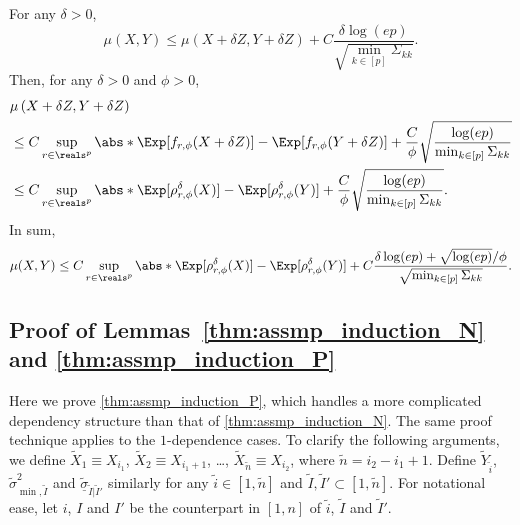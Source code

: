 \documentclass[aos]{imsart}
\begin{document}
\begin{appendix}
For any $\delta > 0$,
\begin{equation} \label{eq:G_smoothing}
    \mu\left(X, Y\right)
    \leq \mu\left(X + \delta Z, Y + \delta Z \right)
    + C \frac{\delta \log(ep)}{\sqrt{\min_{k \in [p]} \Sigma_{kk}}}.
\end{equation}
Then, for any $\delta > 0$ and $\phi > 0$, 
\begin{equation*}
\begin{aligned}
    & \mu\left(X + \delta Z, Y + \delta Z \right) \\
    & \leq C \sup_{r \in \reals^p} \abs*{ \Exp[f_{r,\phi}(X + \delta Z)] - \Exp[f_{r,\phi}(Y + \delta Z)]}
    + \frac{C}{\phi} \sqrt{\frac{\log(ep)}{\min_{k \in [p]} \Sigma_{kk}}} \\
    & \leq C \sup_{r \in \reals^p} \abs*{ \Exp[\rho_{r,\phi}^\delta(X)] - \Exp[\rho_{r,\phi}^\delta(Y)]}
    + \frac{C}{\phi} \sqrt{\frac{\log(ep)}{\min_{k \in [p]} \Sigma_{kk}}}. \\
\end{aligned}
\end{equation*}
In sum,
\begin{equation*}
    \mu(X, Y) 
    \leq C \sup_{r \in \reals^p} \abs*{ \Exp[\rho_{r,\phi}^\delta(X)] - \Exp[\rho_{r,\phi}^\delta(Y)]}
    + C \frac{\delta \log(ep) + \sqrt{\log(ep)}/\phi}{\sqrt{\min_{k \in [p]} \Sigma_{kk}}}.
\end{equation*}




\subsection{Proof of Lemmas~\ref{thm:assmp_induction_N} and \ref{thm:assmp_induction_P}}

Here we prove \cref{thm:assmp_induction_P}, which handles a more complicated dependency structure than that of \cref{thm:assmp_induction_N}. The same proof technique applies to the $1$-dependence cases.
%
To clarify the following arguments, we define $\tilde{X}_1 \equiv X_{i_1}$, $\tilde{X}_2 \equiv X_{i_1+1}$, \ldots, $\tilde{X}_{\tilde{n}} \equiv X_{i_2}$, where $\tilde{n} = i_2 - i_1 + 1$. Define $\tilde{Y}_{\tilde{i}}$, $\tilde\sigma^2_{\min,\tilde{I}}$ and $\underline{\tilde\sigma}_{\tilde{I}|\tilde{I}'}$ similarly for any $\tilde{i} \in [1,\tilde{n}]$ and $\tilde{I}, \tilde{I}' \subset [1, \tilde{n}]$. For notational ease, let $i$, $I$ and $I'$ be the counterpart in $[1, n]$ of $\tilde{i}$, $\tilde{I}$ and $\tilde{I}'$.


\end{appendix}
\end{document}
